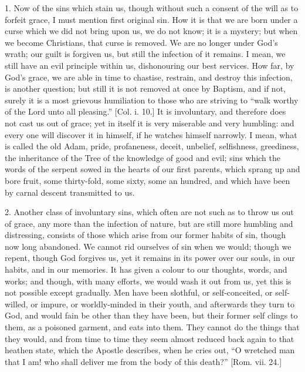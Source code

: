 1. Now of the sins which stain us, though without such a consent of
the will as to forfeit grace, I must mention first original sin. How
it is that we are born under a curse which we did not bring upon us,
we do not know; it is a mystery; but when we become Christians, that
curse is removed. We are no longer under God's wrath; our guilt is
forgiven us, but still the infection of it remains. I mean, we still
have an evil principle within us, dishonouring our best services. How
far, by God's grace, we are able in time to chastise, restrain, and
destroy this infection, is another question; but still it is not
removed at once by Baptism, and if not, surely it is a most grievous
humiliation to those who are striving to ``walk worthy of the Lord
unto all pleasing.'' [Col. i. 10.] It is involuntary, and
therefore does not cast us out of grace; yet in itself it is very
miserable and very humbling: and every one will discover it in
himself, if he watches himself narrowly. I mean, what is called the
old Adam, pride, profaneness, deceit, unbelief, selfishness,
greediness, the inheritance of the Tree of the knowledge of good and
evil; sins which the words of the serpent sowed in the hearts of our
first parents, which sprang up and bore fruit, some thirty-fold, some
sixty, some an hundred, and which have been by carnal descent
transmitted to us.

2. Another class of involuntary sins, which often are not such as
to throw us out of grace, any more than the infection of nature, but
are still more humbling and distressing, consists of those which arise
from our former habits of sin, though now long abandoned. We cannot
rid ourselves of sin when we would; though we repent, though God
forgives us, yet it remains in its power over our souls, in our
habits, and in our memories. It has given a colour to our thoughts,
words, and works; and though, with many efforts, we would wash it out
from us, yet this is not possible except gradually. Men have been
slothful, or self-conceited, or self-willed, or impure, or
worldly-minded in their youth, and afterwards they turn to God, and
would fain be other than they have been, but their former self clings
to them, as a poisoned garment, and eats into them. They cannot do the
things that they would, and from time to time they seem almost reduced
back again to that heathen state, which the Apostle describes, when he
cries out, ``O wretched man that I am! who shall deliver me from
the body of this death?'' [Rom. vii. 24.]

